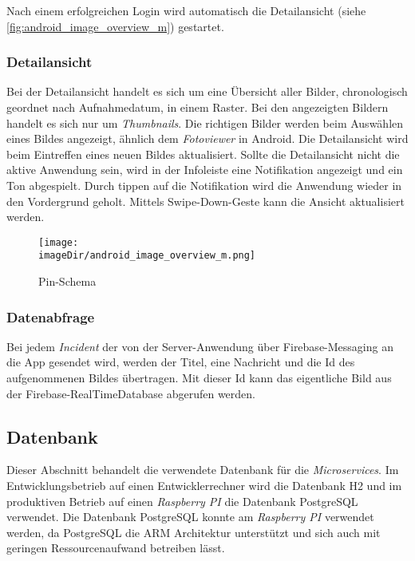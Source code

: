 Nach einem erfolgreichen Login wird automatisch die Detailansicht (siehe \autoref{fig:android_image_overview_m}) gestartet.
\newpage

\subsubsection{Detailansicht}
Bei der Detailansicht handelt es sich um eine Übersicht aller Bilder, chronologisch geordnet nach Aufnahmedatum, in einem Raster. Bei den angezeigten Bildern handelt es sich nur um \emph{Thumbnails}. Die richtigen Bilder werden beim Auswählen eines Bildes angezeigt, ähnlich dem \emph{Fotoviewer} in Android.
\newline
\newline
Die Detailansicht wird beim Eintreffen eines neuen Bildes aktualisiert. Sollte die Detailansicht nicht die aktive Anwendung sein, wird in der Infoleiste eine Notifikation angezeigt und ein Ton abgespielt. Durch tippen auf die Notifikation wird die Anwendung wieder in den Vordergrund geholt.
\newline
\newline
Mittels Swipe-Down-Geste kann die Ansicht aktualisiert werden.
\begin{figure}[h]
	\centering
	\texttt{[image: \\imageDir/android\_image\_overview\_m.png]}
	\caption{Pin-Schema}
	\label{fig:android_image_overview_m}
\end{figure}

\subsubsection{Datenabfrage}
Bei jedem \emph{Incident} der von der Server-Anwendung über Firebase-Messaging an die App gesendet wird, werden der Titel, eine Nachricht und die Id des aufgenommenen Bildes übertragen. Mit dieser Id kann das eigentliche Bild aus der Firebase-RealTimeDatabase abgerufen werden.\\

\begin{code}
	\caption{FirebaseMessaging.java}
	\label{src:FirebaseMessaging}
\end{code}

\subsection{Datenbank}
Dieser Abschnitt behandelt die verwendete Datenbank für die \emph{Microservices}. Im Entwicklungsbetrieb auf einen Entwicklerrechner wird die Datenbank H2 und im produktiven Betrieb auf einen \emph{Raspberry PI} die Datenbank PostgreSQL verwendet. Die Datenbank PostgreSQL konnte am \emph{Raspberry PI} verwendet werden, da PostgreSQL die ARM Architektur unterstützt und sich auch mit geringen Ressourcenaufwand betreiben lässt.

